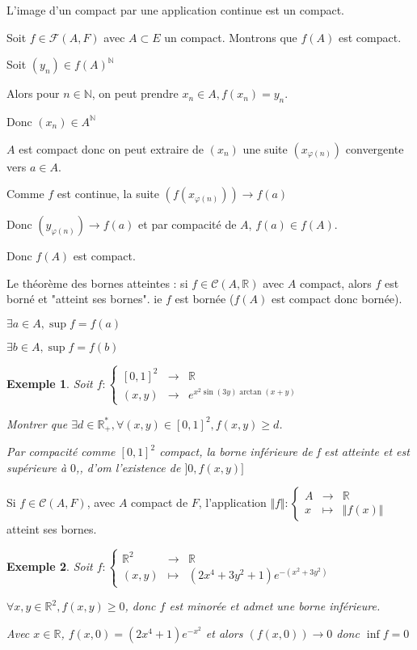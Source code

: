 \documentclass[a4paper,12pt]{book}
\newcommand{\Thr}[2]{\begin{tcolorbox}[sharp corners, colback=white,colframe=red!90!black!75, title=Théorème : #1]#2\end{tcolorbox}}
\newcommand{\Prop}[2]{\begin{tcolorbox}[sharp corners, colback=white,colframe=red!90!black!75, title=Proposition : #1]#2\end{tcolorbox}}
\newcommand{\Pre}[1]{\begin{tcolorbox}[sharp corners, colback=white,colframe=green!60!green!30!black!75, title=Preuve]#1\end{tcolorbox}}
\newtheorem{Exe}{Exemple}[section]
\def\R{\mathbb{R}}
\def\N{\mathbb{N}}
\begin{document}
\Thr{Bornes atteintes le retour}{L'image d'un compact par une application continue est un compact.}
\Pre{Soit $f\in\mathcal{F}(A,F)$ avec $A\subset E$ un compact. Montrons que $f(A)$ est compact. \par Soit $(y_n)\in f(A)^\N$ \par Alors pour $n\in\N$, on peut prendre $x_n\in A, f(x_n)=y_n$. \par Donc $(x_n)\in A^\N$ \par $A$ est compact donc on peut extraire de $(x_n)$ une suite $(x_{\varphi(n)})$ convergente vers $a\in A$. \par Comme $f$ est continue, la suite $\left(f(x_{\varphi(n)})\right)\to f(a)$ \par Donc $(y_{\varphi(n)})\to f(a)$ et par compacité de $A$, $f(a)\in f(A)$. \par Donc $f(A)$ est compact.}
\Prop{Corollaire}{Le théorème des bornes atteintes : si $f\in\mathcal{C}(A,\R)$ avec $A$ compact, alors $f$ est borné et "atteint ses bornes". ie $f$ est bornée ($f(A)$ est compact donc bornée). \par $\exists a\in A, \sup f = f(a)$ \par $\exists b\in A,\sup f=f(b)$}
\begin{Exe}
Soit $f:\left\{\begin{array}{rcl}[0,1]^2 & \to & \R \\ (x,y) & \to & e^{x^2\sin(3y)\arctan(x+y)}\end{array}\right.$
\par Montrer que $\exists d\in\R_+^*, \forall (x,y)\in [0,1]^2,f(x,y)\geq d$. \par Par compacité comme $[0,1]^2$ compact, la borne inférieure de f est atteinte et est supérieure à $0$,, d'om l'existence de $]0,f(x,y)]$
\end{Exe}
\Prop{Corollaire}{Si $f\in\mathcal{C}(A,F)$, avec $A$ compact de $F$, l'application $\Vert f\Vert:\left\{\begin{array}{rcl} A&\to&\R \\ x&\mapsto&\Vert f(x)\Vert\end{array}\right.$ atteint ses bornes.}
\begin{Exe}
Soit $f:\left\{\begin{array}{rcl} \R^2 & \to & \R \\ (x,y) & \mapsto & (2x^4+3y^2+1)e^{-(x^2+3y^2)} \end{array}\right.$ \par $\forall x,y\in\R^2, f(x,y)\geq 0$, donc $f$ est minorée et admet une borne inférieure. \par Avec $x\in\R$, $f(x,0) = (2x^4+1)e^{-x^2}$ et alors $\left(f(x,0)\right)\to 0$ donc $\inf f=0$ 
\end{Exe}
\end{document}
